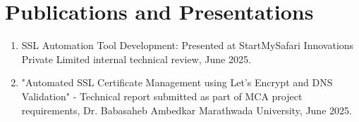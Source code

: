 \documentclass[12pt, a4paper
,openany
]{Thesis} %
\begin{document}
\renewcommand\bibname{References}



\clearpage
\section*{Publications and Presentations}
\begin{enumerate}
    \item SSL Automation Tool Development: Presented at StartMySafari Innovations Private Limited internal technical review, June 2025.
    \item "Automated SSL Certificate Management using Let's Encrypt and DNS Validation" - Technical report submitted as part of MCA project requirements, Dr. Babasaheb Ambedkar Marathwada University, June 2025.
\end{enumerate}

\makeatother
% 
% 


\let\origchapter\chapter
\renewcommand{\chapter}[1]{%
  \origchapter{#1}%
  \thispagestyle{plain}%
}

\thispagestyle{empty}
\null
\newpage

\thispagestyle{empty}
\null
\newpage
\end{document}

